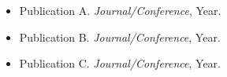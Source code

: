 \begin{itemize}
    \item Publication A. \emph{Journal/Conference}, Year.
    \item Publication B. \emph{Journal/Conference}, Year.
    \item Publication C. \emph{Journal/Conference}, Year.
\end{itemize}

